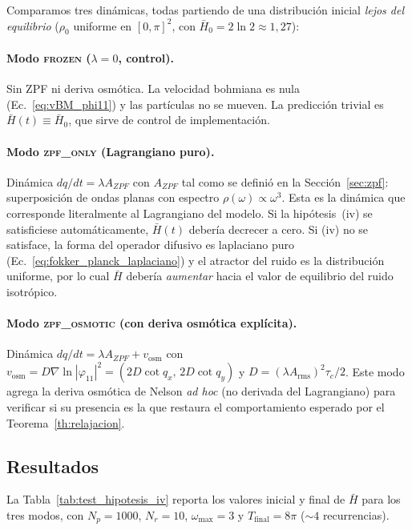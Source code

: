 \documentclass[11pt,a4paper]{article}
\begin{document}
Comparamos tres dinámicas, todas partiendo de una distribución inicial
\emph{lejos del equilibrio} ($\rho_0$ uniforme en $[0,\pi]^2$, con
$\bar{H}_0=2\ln 2\approx 1{,}27$):

\paragraph{Modo \textsc{frozen} ($\lambda=0$, control).}
Sin ZPF ni deriva osmótica. La velocidad bohmiana es nula
(Ec.~\ref{eq:vBM_phi11}) y las partículas no se mueven. La predicción
trivial es $\bar{H}(t)\equiv\bar{H}_0$, que sirve de control de
implementación.

\paragraph{Modo \textsc{zpf\_only} (Lagrangiano puro).}
Dinámica $dq/dt = \lambda A_{ZPF}$ con $A_{ZPF}$ tal como se definió en
la Sección~\ref{sec:zpf}: superposición de ondas planas con espectro
$\rho(\omega)\propto\omega^3$. Esta es la dinámica que corresponde
literalmente al Lagrangiano del modelo. Si la hipótesis~(iv) se
satisficiese automáticamente, $\bar{H}(t)$ debería decrecer a cero. Si
(iv) no se satisface, la forma del operador difusivo es laplaciano
puro (Ec.~\ref{eq:fokker_planck_laplaciano}) y el atractor del ruido
es la distribución uniforme, por lo cual $\bar{H}$ debería
\emph{aumentar} hacia el valor de equilibrio del ruido isotrópico.

\paragraph{Modo \textsc{zpf\_osmotic} (con deriva osmótica explícita).}
Dinámica
$dq/dt = \lambda A_{ZPF} + v_\text{osm}$
con
$v_\text{osm} = D\nabla\ln|\varphi_{11}|^2 = (2D\cot q_x,\, 2D\cot q_y)$
y $D = (\lambda A_\text{rms})^2\tau_c/2$. Este modo agrega la deriva
osmótica de Nelson \emph{ad hoc} (no derivada del Lagrangiano) para
verificar si su presencia es la que restaura el comportamiento esperado
por el Teorema~\ref{th:relajacion}.

\subsection{Resultados}
\label{sec:resultados_test}

La Tabla~\ref{tab:test_hipotesis_iv} reporta los valores inicial y
final de $\bar{H}$ para los tres modos, con $N_p=1000$, $N_r=10$,
$\omega_\text{max}=3$ y $T_\text{final}=8\pi$ ($\sim 4$ recurrencias).
\end{document}
